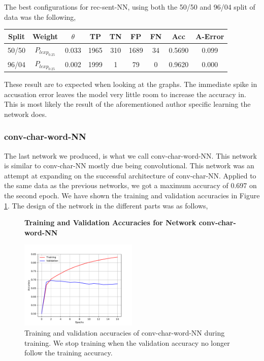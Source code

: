 The best configurations for \gls{rec-sent-NN}, using both the 50/50 and
96/04 split of data was the following,

\begin{center}
    \begin{tabular}{|c|c|c|c|c|c|c|c|c|}
    \hline
    Split & Weight            & $\theta$ & TP   & TN  & FP   & FN  & Acc    & A-Error \\ \hline
    50/50 & $P_{lexp_{0.25}}$ & 0.033    & 1965 & 310 & 1689 & 34  & 0.5690 & 0.099   \\ \hline
    96/04 & $P_{lexp_{0.25}}$ & 0.002    & 1999 & 1   & 79   & 0   & 0.9620 & 0.000   \\ \hline
    \end{tabular}
\end{center}

These result are to expected when looking at the graphs. The immediate spike in
accusation error leaves the model very little room to increase the accuracy in.
This is most likely the result of the aforementioned author specific learning
the network does.


\subsubsection{\glsdesc{conv-char-word-NN}}
\label{subsubsec:conv_char_word_nn}

The last network we produced, is what we call \gls{conv-char-word-NN}. This
network is similar to \gls{conv-char-NN} mostly due being convolutional.
This network was an attempt at expanding on the successful architecture of
\gls{conv-char-NN}. Applied to the same data as the previous networks, we got a
maximum accuracy of 0.697 on the second epoch. We have shown the training and
validation accuracies in Figure \ref{fig:conv-char-word-NN-training}. The design
of the network in the different parts was as follows,

\begin{figure}
    \centering
    \textbf{Training and Validation Accuracies for Network \gls{conv-char-word-NN}}\par\medskip
    \includegraphics[width=0.5\textwidth]{./pictures/experiments/conv_char_word_nn/training}
    \caption{Training and validation accuracies of \gls{conv-char-word-NN}
        during training. We stop training when the validation accuracy no longer
        follow the training accuracy.}
    \label{fig:conv-char-word-NN-training}
\end{figure}

